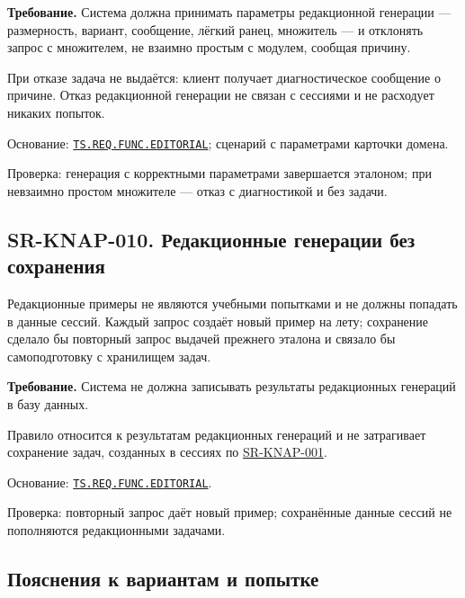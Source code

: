 \documentclass[12pt,a4paper]{article}
\begin{document}
\textbf{Требование.} Система должна принимать параметры редакционной генерации --- размерность, вариант, сообщение, лёгкий ранец, множитель --- и отклонять запрос с множителем, не взаимно простым с модулем, сообщая причину.

При отказе задача не выдаётся: клиент получает диагностическое сообщение о причине. Отказ редакционной генерации не связан с сессиями и не расходует никаких попыток.

Основание: {\href{../02\_Техническое\_задание/DOC-02\_Техническое\_задание.pdf\#ts-req-func-editorial}{\texttt{TS.\allowbreak{}REQ.\allowbreak{}FUNC.\allowbreak{}EDITORIAL}}}; сценарий с параметрами карточки домена.

Проверка: генерация с корректными параметрами завершается эталоном; при невзаимно простом множителе --- отказ с диагностикой и без задачи.

\subsection{SR-KNAP-010. Редакционные генерации без сохранения}\label{sr-knap-010-ux440ux435ux434ux430ux43aux446ux438ux43eux43dux43dux44bux435-ux433ux435ux43dux435ux440ux430ux446ux438ux438-ux431ux435ux437-ux441ux43eux445ux440ux430ux43dux435ux43dux438ux44f}

\hypertarget{sr-knap-010-редакционные-генерации-без-сохранения}{}

\hypertarget{sr-knap-010}{}

Редакционные примеры не являются учебными попытками и не должны попадать в данные сессий. Каждый запрос создаёт новый пример на лету; сохранение сделало бы повторный запрос выдачей прежнего эталона и связало бы самоподготовку с хранилищем задач.

\textbf{Требование.} Система не должна записывать результаты редакционных генераций в базу данных.

Правило относится к результатам редакционных генераций и не затрагивает сохранение задач, созданных в сессиях по {\hyperlink{sr-knap-001}{SR-KNAP-001}}.

Основание: {\href{../02\_Техническое\_задание/DOC-02\_Техническое\_задание.pdf\#ts-req-func-editorial}{\texttt{TS.\allowbreak{}REQ.\allowbreak{}FUNC.\allowbreak{}EDITORIAL}}}.

Проверка: повторный запрос даёт новый пример; сохранённые данные сессий не пополняются редакционными задачами.

\subsection{Пояснения к вариантам и попытке}\label{ux43fux43eux44fux441ux43dux435ux43dux438ux44f-ux43a-ux432ux430ux440ux438ux430ux43dux442ux430ux43c-ux438-ux43fux43eux43fux44bux442ux43aux435}
\end{document}
